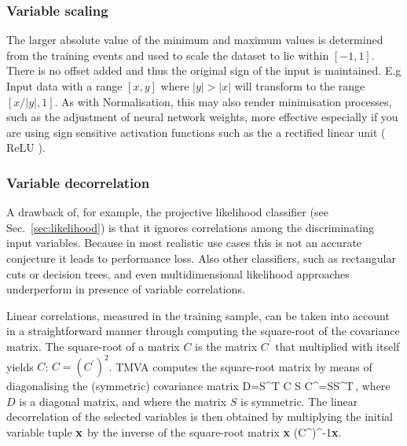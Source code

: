 \subsubsection{Variable scaling}
\label{sec:scaling}

The larger absolute value of the minimum and maximum values is determined from the training events 
and used to scale the dataset to lie within $[-1,1]$. There is no offset added and thus the original 
sign of the input is maintained. E.g Input data with a range $[x,y]$ where $|y|>|x|$ will transform 
to the range $[x/|y|,1]$. 
As with Normalisation, this may also render minimisation processes, such as the adjustment of 
neural network weights, more effective especially if you are using sign sensitive activation 
functions such as the a rectified linear unit ( ReLU ).

\subsubsection{Variable decorrelation}
\label{sec:decorrelation}

A drawback of, for example, the projective likelihood classifier (see 
Sec.~\ref{sec:likelihood}) is that it ignores correlations among the discriminating 
input variables. Because in most realistic use cases this is not an accurate 
conjecture it leads to performance loss. Also other classifiers, such as rectangular 
cuts or decision trees, and even multidimensional likelihood approaches underperform
in presence of variable correlations.

Linear correlations, measured in the training sample, can be taken into account 
in a straightforward manner through computing the square-root of the covariance 
matrix. The square-root of a matrix $C$ is the matrix $C^\prime$ that multiplied 
with itself yields $C$: $C=(C^\prime)^2$. TMVA computes the square-root matrix 
by means of diagonalising the (symmetric) covariance matrix
\beq
    D=S^T C S \hspace{0.5cm}\Rightarrow \hspace{0.5cm}
    C^\prime=SS^T\,,
\eeq
where $D$ is a diagonal matrix, and where the matrix $S$ is symmetric. The linear 
decorrelation of the selected variables is then obtained by multiplying the 
initial variable tuple ${\bf x}$ by the inverse of the square-root matrix
\beq
      {\bf x} \mapsto (C^\prime)^{-1}{\bf x}\:.
\eeq


